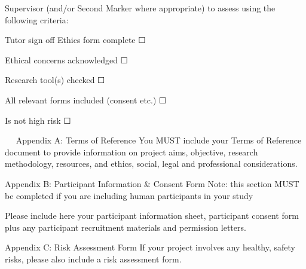 \documentclass[../CHEFCookingHelperForEveryonesFridge.tex]{subfiles}
\begin{document}
Supervisor (and/or Second Marker where appropriate) to assess using the following criteria:

Tutor sign off
Ethics form complete	☐

Ethical concerns acknowledged	☐

Research tool(s) checked	☐

All relevant forms included (consent etc.)	☐

Is not high risk	☐

  
Appendix A: Terms of Reference
You MUST include your Terms of Reference document to provide information on project aims, objective, research methodology, resources, and ethics, social, legal and professional considerations.


Appendix B: Participant Information \& Consent Form
Note: this section MUST be completed if you are including human participants in your study

Please include here your participant information sheet, participant consent form plus any participant recruitment materials and permission letters.

Appendix C: Risk Assessment Form
If your project involves any healthy, safety risks, please also include a risk assessment form.

\ifSubfilesClassLoaded{
    \todos
}{}
\end{document}
